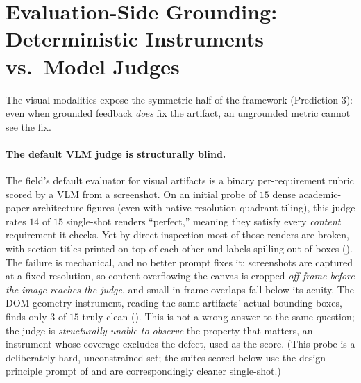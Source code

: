 \section{Evaluation-Side Grounding: Deterministic Instruments vs.\ Model Judges}
\label{sec:grounded_eval}

The visual modalities expose the symmetric half of the framework (Prediction 3): even when grounded feedback \emph{does} fix the artifact, an ungrounded metric cannot see the fix.

\paragraph{The default VLM judge is structurally blind.} The field's default evaluator for visual artifacts is a binary per-requirement rubric scored by a VLM from a screenshot. On an initial probe of $15$ dense academic-paper architecture figures (even with native-resolution quadrant tiling), this judge rates $14$ of $15$ single-shot renders ``perfect,'' meaning they satisfy every \emph{content} requirement it checks. Yet by direct inspection most of those renders are broken, with section titles printed on top of each other and labels spilling out of boxes (). The failure is mechanical, and no better prompt fixes it: screenshots are captured at a fixed resolution, so content overflowing the canvas is cropped \emph{off-frame before the image reaches the judge}, and small in-frame overlaps fall below its acuity. The DOM-geometry instrument, reading the same artifacts' actual bounding boxes, finds only $3$ of $15$ truly clean (). This is not a wrong answer to the same question; the judge is \emph{structurally unable to observe} the property that matters, an instrument whose coverage excludes the defect, used as the score. (This probe is a deliberately hard, unconstrained set; the suites scored below use the design-principle prompt of  and are correspondingly cleaner single-shot.)

